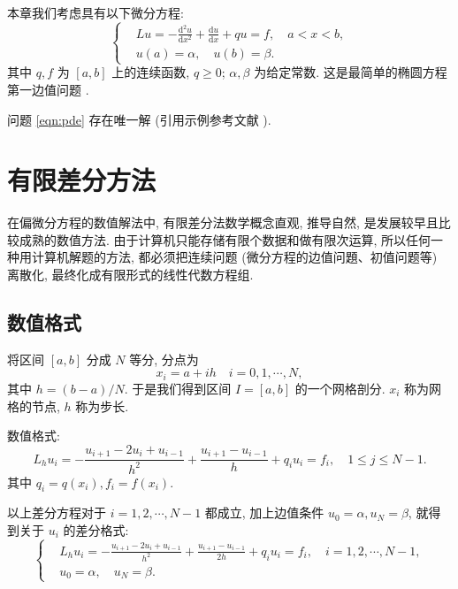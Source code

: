 \documentclass{shnuthesis}
\begin{document}
本章我们考虑具有以下微分方程:
\begin{equation}\label{eqn:pde}
\left\{\begin{aligned}
& L u=-\frac{\mathrm{d}^{2} u}{\mathrm{d} x^{2}}+\frac{\mathrm{d} u}{\mathrm{d} x}+q u=f, \quad a < x < b, \\
& u(a)=\alpha, \quad u(b)=\beta.
\end{aligned}\right.
\end{equation}
其中 $q, f$ 为 $[a,b]$ 上的连续函数, $q \geqslant 0$; $\alpha, \beta$ 为给定常数. 这是最简单的椭圆方程第一边值问题 .

问题 \eqref{eqn:pde} 存在唯一解 (引用示例参考文献 \cite{LiLiu1997}).


\section{有限差分方法}
在偏微分方程的数值解法中, 有限差分法数学概念直观, 推导自然, 是发展较早且比较成熟的数值方法. 由于计算机只能存储有限个数据和做有限次运算, 所以任何一种用计算机解题的方法, 都必须把连续问题 (微分方程的边值问題、初值问题等) 离散化, 最终化成有限形式的线性代数方程组.

\subsection{数值格式}
将区间 $[a,b]$ 分成 $N$ 等分, 分点为
\begin{equation*}
  x_{i}=a+i h \quad i=0,1, \cdots, N,
\end{equation*}
其中 $h=(b-a) / N$. 于是我们得到区间 $I=[a,b]$ 的一个网格剖分. $x_i$ 称为网格的节点, $h$ 称为步长.

数值格式:
\begin{equation*}
  L_{h} u_{i}=-\frac{u_{i+1}-2 u_{i}+u_{i-1}}{h^{2}}+\frac{u_{i+1}-u_{i-1}}{h}+q_{i} u_{i}=f_{i},\quad 1 \leqslant j \leqslant N-1.
\end{equation*}
其中  $q_{i}=q(x_{i}), f_{i}=f(x_{i})$.

以上差分方程对于 $i=1,2, \cdots, N-1$ 都成立, 加上边值条件 $u_{0}=\alpha, u_{N}=\beta$, 就得到关于 $u_i$ 的差分格式:
\begin{equation}\label{eqn:fdm}
\left\{\begin{aligned}
& L_{h} u_{i}=-\frac{u_{i+1}-2 u_{i}+u_{i-1}}{h^{2}}+\frac{u_{i+1}-u_{i-1}}{2h}+q_{i} u_{i}=f_{i}, \quad i=1,2, \cdots, N-1, \\
& u_{0}=\alpha, \quad u_{N}=\beta.
\end{aligned}\right.
\end{equation}
\end{document}
